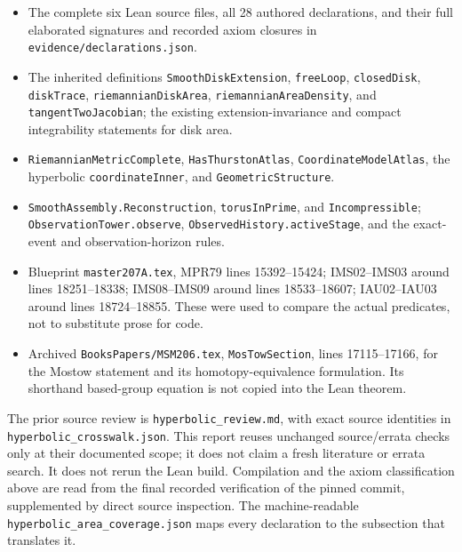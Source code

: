 \documentclass[
  letterpaper,
  11pt]{article}
\providecommand{\tightlist}{%
  \setlength{\itemsep}{0pt}\setlength{\parskip}{0pt}}
\begin{document}
\begin{itemize}
\tightlist
\item
  The complete six Lean source files, all 28 authored declarations, and
  their full elaborated signatures and recorded axiom closures in
  {\small\texttt{evidence/\allowbreak{}declarations.\allowbreak{}json}}.
\item
  The inherited definitions
  {\small\texttt{Smooth\allowbreak{}Disk\allowbreak{}Extension}},
  {\small\texttt{free\allowbreak{}Loop}},
  {\small\texttt{closed\allowbreak{}Disk}},
  {\small\texttt{disk\allowbreak{}Trace}},
  {\small\texttt{riemannian\allowbreak{}Disk\allowbreak{}Area}},
  {\small\texttt{riemannian\allowbreak{}Area\allowbreak{}Density}}, and
  {\small\texttt{tangent\allowbreak{}Two\allowbreak{}Jacobian}}; the
  existing extension-invariance and compact integrability statements for
  disk area.
\item
  {\small\texttt{Riemannian\allowbreak{}Metric\allowbreak{}Complete}},
  {\small\texttt{Has\allowbreak{}Thurston\allowbreak{}Atlas}},
  {\small\texttt{Coordinate\allowbreak{}Model\allowbreak{}Atlas}}, the
  hyperbolic {\small\texttt{coordinate\allowbreak{}Inner}}, and
  {\small\texttt{Geometric\allowbreak{}Structure}}.
\item
  {\small\texttt{Smooth\allowbreak{}Assembly.\allowbreak{}Reconstruction}},
  {\small\texttt{torus\allowbreak{}In\allowbreak{}Prime}}, and
  {\small\texttt{Incompressible}};
  {\small\texttt{Observation\allowbreak{}Tower.\allowbreak{}observe}},
  {\small\texttt{Observed\allowbreak{}History.\allowbreak{}active\allowbreak{}Stage}},
  and the exact-event and observation-horizon rules.
\item
  Blueprint {\small\texttt{master207A.\allowbreak{}tex}}, MPR79 lines
  15392--15424; IMS02--IMS03 around lines 18251--18338; IMS08--IMS09
  around lines 18533--18607; IAU02--IAU03 around lines 18724--18855.
  These were used to compare the actual predicates, not to substitute
  prose for code.
\item
  Archived
  {\small\texttt{Books\allowbreak{}Papers/\allowbreak{}MSM206.\allowbreak{}tex}},
  {\small\texttt{Mos\allowbreak{}Tow\allowbreak{}Section}}, lines
  17115--17166, for the Mostow statement and its homotopy-equivalence
  formulation. Its shorthand based-group equation is not copied into the
  Lean theorem.
\end{itemize}

The prior source review is
{\small\texttt{hyperbolic\_\allowbreak{}review.\allowbreak{}md}}, with
exact source identities in
{\small\texttt{hyperbolic\_\allowbreak{}crosswalk.\allowbreak{}json}}.
This report reuses unchanged source/errata checks only at their
documented scope; it does not claim a fresh literature or errata search.
It does not rerun the Lean build. Compilation and the axiom
classification above are read from the final recorded verification of
the pinned commit, supplemented by direct source inspection. The
machine-readable
{\small\texttt{hyperbolic\_\allowbreak{}area\_\allowbreak{}coverage.\allowbreak{}json}}
maps every declaration to the subsection that translates it.
\end{document}
